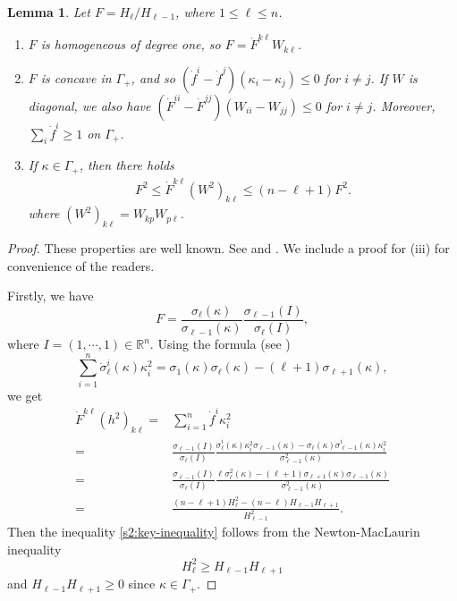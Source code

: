 \documentclass[11pt,reqno]{amsart}
\newtheorem{lem}[thm]{Lemma}
\theoremstyle{definition}
\theoremstyle{remark}
\numberwithin{equation}{section}
\renewcommand{\(}{\left(}
\renewcommand{\)}{\right)}
\renewcommand{\-}{\overline}
\renewcommand{\k}{\kappa}
\newcommand{\s}{\sigma}
\newcommand{\G}{\Gamma}
\begin{document}
\begin{lem}\label{s2.lem3}
Let $F={H_\ell}/{H_{\ell-1}}$, where $1\leq \ell\leq n$.
\begin{enumerate}
  \item $F$ is homogeneous of degree one, so $F=\dot{F}^{k\ell}W_{k\ell}$.
  \item $F$ is concave in $\Gamma_{+}$, and so $(\dot{f}^i-\dot{f}^j)(\kappa_i-\kappa_j)\leq 0$ for $i\neq j$. If $W$ is diagonal, we also have $(\dot{F}^{ii}-\dot{F}^{jj})(W_{ii}-W_{jj})\leq 0$ for $i\neq j$. Moreover, $\sum_i\dot{f}^i\geq 1$ on $\Gamma_+$.
  \item If $\k\in \G_{+}$, then there holds
\begin{align}\label{s2:key-inequality}
F^2\leq \dot{F}^{k\ell}(W^2)_{k\ell}\leq (n-\ell+1)F^2.
\end{align}
where $(W^2)_{k\ell}=W_{kp}W_{p\ell}$.
\end{enumerate}
\end{lem}
\begin{proof}
These properties are well known. See \cite{guan2014} and \cite{Andrews-McCoy-Zheng}. We include a proof for (iii) for convenience of the readers.

Firstly, we have
$$
F=\frac{\s_{\ell}(\k)}{\s_{\ell-1}(\k)}\frac{\s_{\ell-1}(I)}{\s_{\ell}(I)},
$$
where $I=(1,\cdots,1)\in \mathbb{R}^n$. Using the formula (see \cite[Proposition 2.2]{guan2014})
\begin{equation*}
  \sum_{i=1}^n \dot{\sigma}_\ell^i(\kappa)\k_i^2=\s_1(\k)\s_\ell(\k)-(\ell+1)\s_{\ell+1}(\k),
\end{equation*}
we get
\begin{align*}
\dot{F}^{k\ell}(h^2)_{k\ell}=&\sum_{i=1}^{n}\dot{f}^i\k_i^2\\
=&\frac{\s_{\ell-1}(I)}{\s_{\ell}(I)} \frac{\dot{\s}_{\ell}^i(\kappa)\k_i^2\s_{\ell-1}(\k)-\s_{\ell}(\k)\dot{\s}^i_{\ell-1}(\kappa)\k_i^2}{\s_{\ell-1}^2(\k)}\\
=&\frac{\s_{\ell-1}(I)}{\s_{\ell}(I)} \frac{\ell\s_{\ell}^2(\k)-(\ell+1)\s_{\ell+1}(\k)\s_{\ell-1}(\k)}{\s_{\ell-1}^2(\k)}\\
=&\frac{(n-\ell+1)H_{\ell}^2-(n-\ell)H_{\ell-1}H_{\ell+1}}{H_{\ell-1}^2}.
\end{align*}
Then the inequality \eqref{s2:key-inequality} follows from the Newton-MacLaurin inequality
$$
H_{\ell}^2 \geq H_{\ell-1}H_{\ell+1}
$$
and $H_{\ell-1}H_{\ell+1}\geq 0$ since $\k\in \G_{+}$.
\end{proof}
\end{document}
